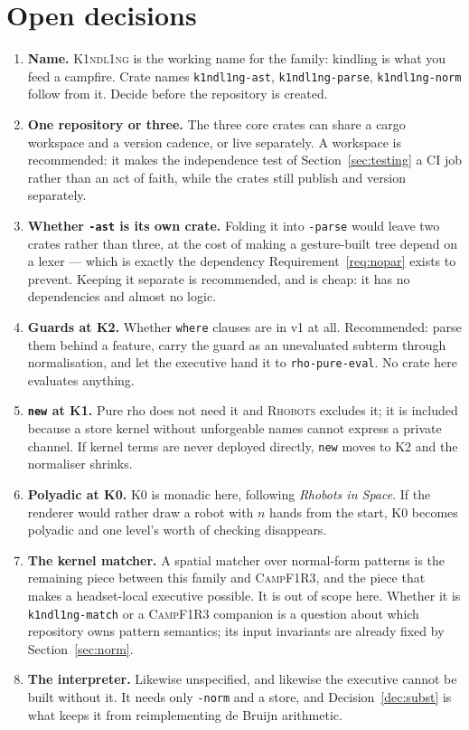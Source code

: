 \documentclass[11pt,a4paper]{article}
\newcommand{\code}[1]{\texttt{#1}}
\newcommand{\Kind}{\textsc{K1ndl1ng}}
\newcommand{\Camp}{\textsc{CampF1R3}}
\newcommand{\Rhobots}{\textsc{Rhobots}}
\theoremstyle{definition}
\theoremstyle{plain}
\begin{document}
\section{Open decisions}\label{sec:open}

\begin{enumerate}[leftmargin=1.8em,nosep]
\item \textbf{Name.} \Kind{} is the working name for the family: kindling is
what you feed a campfire. Crate names \code{k1ndl1ng-ast},
\code{k1ndl1ng-parse}, \code{k1ndl1ng-norm} follow from it. Decide before the
repository is created.
\item \textbf{One repository or three.} The three core crates can share a cargo
workspace and a version cadence, or live separately. A workspace is recommended:
it makes the independence test of Section~\ref{sec:testing} a CI job rather than
an act of faith, while the crates still publish and version separately.
\item \textbf{Whether \code{-ast} is its own crate.} Folding it into
\code{-parse} would leave two crates rather than three, at the cost of making a
gesture-built tree depend on a lexer --- which is exactly the dependency
Requirement~\ref{req:nopar} exists to prevent. Keeping it separate is
recommended, and is cheap: it has no dependencies and almost no logic.
\item \textbf{Guards at K2.} Whether \code{where} clauses are in v1 at all.
Recommended: parse them behind a feature, carry the guard as an unevaluated
subterm through normalisation, and let the executive hand it to
\code{rho-pure-eval}. No crate here evaluates anything.
\item \textbf{\code{new} at K1.} Pure rho does not need it and \Rhobots{}
excludes it; it is included because a store kernel without unforgeable names
cannot express a private channel. If kernel terms are never deployed directly,
\code{new} moves to K2 and the normaliser shrinks.
\item \textbf{Polyadic at K0.} K0 is monadic here, following \emph{Rhobots in
Space}. If the renderer would rather draw a robot with $n$ hands from the start,
K0 becomes polyadic and one level's worth of checking disappears.
\item \textbf{The kernel matcher.} A spatial matcher over normal-form patterns
is the remaining piece between this family and \Camp, and the piece that makes a
headset-local executive possible. It is out of scope here. Whether it is
\code{k1ndl1ng-match} or a \Camp{} companion is a question about which
repository owns pattern semantics; its input invariants are already fixed by
Section~\ref{sec:norm}.
\item \textbf{The interpreter.} Likewise unspecified, and likewise the executive
cannot be built without it. It needs only \code{-norm} and a store, and
Decision~\ref{dec:subst} is what keeps it from reimplementing de Bruijn
arithmetic.
\end{enumerate}
\end{document}
